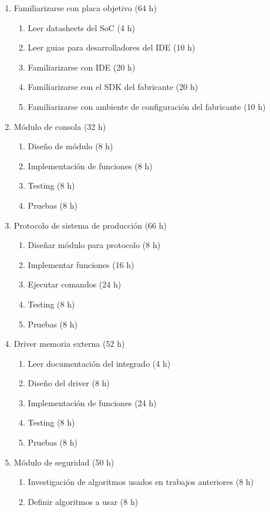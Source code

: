 \documentclass[
11pt, %
]{charter}
\begin{document}
\begin{enumerate}
\item Familiarizarse con placa objetivo (64 h)
	\begin{enumerate}
	\item Leer datasheets del SoC (4 h)
	\item Leer guias para desarrolladores del IDE (10 h)
	\item Familiarizarse con IDE (20 h)
	\item Familiarizarse con el SDK del fabricante (20 h)
	\item Familiarizarse con ambiente de configuración del fabricante (10 h)
	\end{enumerate}
\item Módulo de consola (32 h)
	\begin{enumerate}
	\item Diseño de módulo (8 h)
	\item Implementación de funciones (8 h)
	\item Testing (8 h)
	\item Pruebas (8 h)
	\end{enumerate}
\item Protocolo de sistema de producción (66 h)
	\begin{enumerate}
	\item Diseñar módulo para protocolo (8 h)
	\item Implementar funciones (16 h)
	\item Ejecutar comandos (24 h)
	\item Testing (8 h)
	\item Pruebas (8 h)
	\end{enumerate}
\item Driver memoria externa (52 h)
	\begin{enumerate}
	\item Leer documentación del integrado (4 h)
	\item Diseño del driver	(8 h)
	\item Implementación de funciones (24 h)
	\item Testing (8 h)
	\item Pruebas (8 h)
	\end{enumerate}
\item Módulo de seguridad (50 h)
	\begin{enumerate}
	\item Investigación de algoritmos usados en trabajos anteriores (8 h)
	\item Definir algoritmos a usar (8 h)

\end{enumerate}
\end{enumerate}
\end{document}
